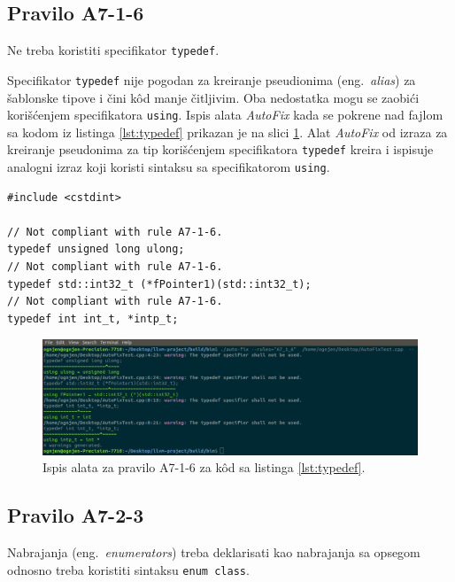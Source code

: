 \documentclass[12pt,oneside]{memoir}
\begin{document}
\subsection{Pravilo A7-1-6}
\begin{center}
\begin{tcolorbox}
Ne treba koristiti specifikator \texttt{typedef}. 
\end{tcolorbox}
\end{center}

Specifikator \texttt{typedef} nije pogodan za kreiranje pseudionima (eng.~\textit{alias}) za \v{s}ablonske tipove i \v{c}ini k\^{o}d manje \v{c}itljivim.
Oba nedostatka mogu se zaobi\'{c}i kori\v{s}\'{c}enjem specifikatora \texttt{using}.  Ispis alata \textit{AutoFix} kada se pokrene nad fajlom sa kodom iz listinga \ref{lst:typedef} prikazan je na slici \ref{fig:A7-1-6}. Alat \textit{AutoFix} od izraza za kreiranje pseudonima za tip kori\v{s}\'{c}enjem
specifikatora \texttt{typedef} kreira i ispisuje analogni izraz koji koristi sintaksu sa specifikatorom \texttt{using}.

\begin{lstlisting}[style=customc, caption={Primer koda koji nije napisan u skladu sa pravilom \textbf{A7-1-6}, odnosno koristi specifikator \texttt{typedef}.}, label=lst:typedef]
#include <cstdint>

// Not compliant with rule A7-1-6.
typedef unsigned long ulong;
// Not compliant with rule A7-1-6.
typedef std::int32_t (*fPointer1)(std::int32_t);
// Not compliant with rule A7-1-6.
typedef int int_t, *intp_t;

\end{lstlisting}

\begin{figure}[!h]
\begin{center}
\includegraphics[scale=0.3]{A7_1_6.png}
\end{center}
\caption{Ispis alata za pravilo A7-1-6 za k\^{o}d sa listinga \ref{lst:typedef}.}
\label{fig:A7-1-6}
\end{figure}


\subsection{Pravilo A7-2-3}
\begin{center}
\begin{tcolorbox}
Nabrajanja (eng.~\textit{enumerators}) treba deklarisati kao nabrajanja sa opsegom odnosno treba koristiti sintaksu \texttt{enum class}.
\end{tcolorbox}
\end{center}
\end{document}
